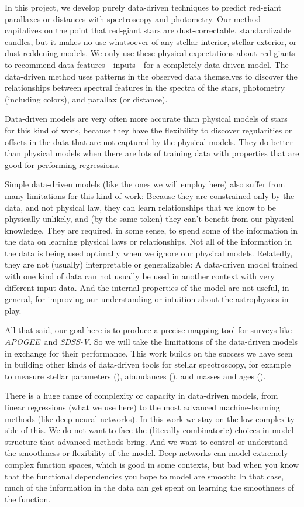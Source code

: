 \documentclass[modern]{aastex62}
\newcommand{\acronym}[1]{{\small{#1}}}
\newcommand{\project}[1]{\textsl{#1}}
\newcommand{\apogee}{\project{\acronym{APOGEE}}}
\newcommand{\sdssv}{\project{\acronym{SDSS-V}}}
\begin{document}
In this project, we develop purely data-driven techniques to predict
red-giant parallaxes or distances with spectroscopy and photometry.
Our method capitalizes on the point that red-giant stars are dust-correctable,
standardizable candles, but it makes no use whatsoever of any stellar interior,
stellar exterior, or dust-reddening models.
We only use these physical expectations about red giants to recommend
data features---inputs---for a completely data-driven model.
The data-driven method uses patterns in the observed data themselves
to discover the relationships between spectral features in the spectra of the stars,
photometry (including colors), and parallax (or distance).

Data-driven models are very often more accurate than physical models of stars
for this kind of work, because they have the flexibility to discover
regularities or offsets in the data that are not captured by the physical
models.
They do better than physical models when there are lots of training data
with properties that are good for performing regressions.

Simple data-driven models (like the ones we will employ here)
also suffer from many limitations for this kind of work:
Because they are constrained only by the data, and not physical law,
they can learn relationships that we know
to be physically unlikely, and (by the same token) they can't benefit from our
physical knowledge.
They are required, in some sense, to spend some of the information in the data on
learning physical laws or relationships.
Not all of the information in the data is being used
optimally when we ignore our physical models.
Relatedly, they are not (usually) interpretable or generalizable:
A data-driven model trained with one kind of data can not usually be used in another
context with very different input data.
And the internal properties of the model are not useful, in general, for improving
our understanding or intuition about the astrophysics in play.

All that said, our goal here is to produce a precise mapping tool for surveys
like \apogee\ and \sdssv.
So we will take the limitations of the data-driven models in exchange for their
performance.
This work builds on the success we have seen in building other kinds of
data-driven tools for  stellar spectroscopy, for example to measure stellar
parameters (\citealt{cannon}), abundances (\citealt{ho, casey, nessdopp}),
and masses and ages (\citealt{nessage}).

There is a huge range of complexity or capacity in data-driven
models, from linear regressions (what we use here) to the most advanced machine-learning
methods (like deep neural networks).
In this work we stay on the low-complexity side of this.
We do not want to face the (literally combinatoric) choices in model structure that
advanced methods bring.
And we want to control or understand the smoothness or flexibility of the model.
Deep networks can model extremely complex function spaces, which is good in some
contexts, but bad when you know that the functional dependencies you hope to
model are smooth:
In that case, much of the information in the data can get spent on learning the
smoothness of the function.
\end{document}
